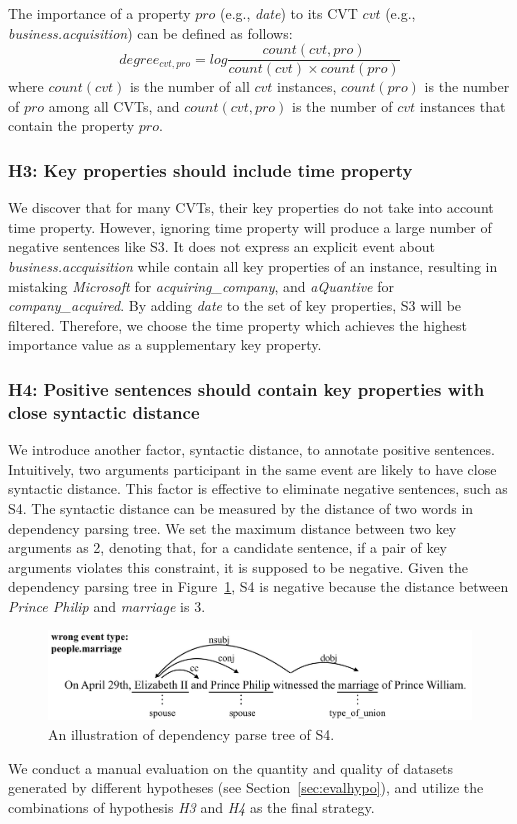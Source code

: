The importance of a property $pro$ (e.g., \emph{date}) to its CVT $cvt$ (e.g., \emph{business.acquisition}) can be defined as follows:
\begin{equation}
	degree_{cvt, pro} = log \frac{count(cvt, pro)}{count(cvt) \times count(pro)} 
\end{equation}
where $count(cvt)$ is the number of all $cvt$ instances, $count(pro)$ is the number of $pro$ among all CVTs, and $count(cvt, pro)$ is the number of $cvt$ instances that contain the property $pro$.

\subsubsection{H3: Key properties should include time property}
We discover that for many CVTs, their key properties do not take into account time property. However, ignoring time property will produce a large number of negative sentences like S3. It does not express an explicit event about \emph{business.accquisition} while contain all key properties of an instance, resulting in mistaking \emph{Microsoft} for \emph{acquiring\_company}, and \emph{aQuantive} for \emph{company\_acquired}. By adding \emph{date} to the set of key properties, S3 will be filtered. Therefore, we choose the time property which achieves the highest importance value as a supplementary key property. 

\subsubsection{H4: Positive sentences should contain key properties with close syntactic distance}
We introduce another factor, syntactic distance, to annotate positive sentences. Intuitively, two arguments participant in the same event are likely to have close syntactic distance. This factor is effective to eliminate negative sentences, such as S4. The syntactic distance can be measured by the distance of two words in dependency parsing tree. We set the maximum distance between two key arguments as 2, denoting that, for a candidate sentence, if a pair of key arguments violates this constraint, it is supposed to be negative. Given the dependency parsing tree in Figure~\ref{fig:2}, S4 is negative because the distance between \emph{Prince Philip} and \emph{marriage} is 3.

\begin{figure}
	\includegraphics[width=.48\textwidth]{deppath}
	\caption{An illustration of dependency parse tree of S4. \label{fig:2}}
\end{figure}

We conduct a manual evaluation on the quantity and quality of  datasets generated by different hypotheses (see Section~\ref{sec:evalhypo}), and utilize the combinations of hypothesis \emph{H3} and \emph{H4} as the final strategy.